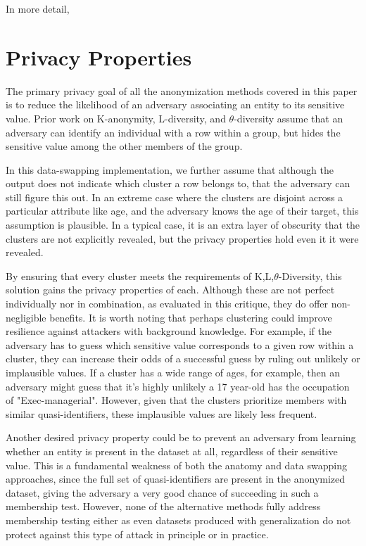 In more detail, 

\section{Privacy Properties}
The primary privacy goal of all the anonymization methods covered in this paper is to reduce the likelihood of an adversary associating an  entity to its sensitive value. Prior work on K-anonymity, L-diversity, and $\theta$-diversity assume that an adversary can identify an individual with a row within a group, but hides the sensitive value among the other members of the group.

In this data-swapping implementation, we further assume that although the output does not indicate which cluster a row belongs to, that the adversary can still figure this out. In an extreme case where the clusters are disjoint across a particular attribute like age, and the adversary knows the age of their target, this assumption is plausible. In a typical case, it is an extra layer of obscurity that the clusters are not explicitly revealed, but the privacy properties hold even it it were revealed.

By ensuring that every cluster meets the requirements of K,L,$\theta$-Diversity, this solution gains the privacy properties of each. Although these are not perfect individually nor in combination, as evaluated in this critique\cite{domingoCritique}, they do offer non-negligible benefits. It is worth noting that perhaps clustering could improve resilience against attackers with background knowledge. For example, if the adversary has to guess which sensitive value corresponds to a given row within a cluster, they can increase their odds of a successful guess by ruling out unlikely or implausible values. If a cluster has a wide range of ages, for example, then an adversary might guess that it's highly unlikely a 17 year-old has the occupation of "Exec-managerial". However, given that the clusters prioritize members with similar quasi-identifiers, these implausible values are likely less frequent.

Another desired privacy property could be to prevent an adversary from learning whether an entity is present in the dataset at all, regardless of their sensitive value. This is a fundamental weakness of both the anatomy and data swapping approaches, since the full set of quasi-identifiers are present in the anonymized dataset, giving the adversary a very good chance of succeeding in such a membership test. However, none of the alternative methods fully address membership testing either as even datasets produced with generalization do not protect against this type of attack in principle or in practice.

